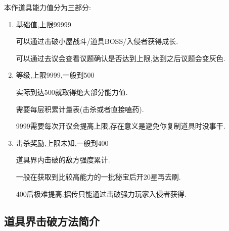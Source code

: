 	本作道具能力值分为三部分:

	\begin{enumerate}

		\item 
		基础值,上限99999

		可以通过击破小屋战斗/道具BOSS/入侵者获得成长.

		可以通过去议会查看议题确认是否达到上限,达到之后议题会变灰色.

		\item
		等级,上限9999,一般到500

		实际到达500就取得绝大部分能力值.

		需要每层积累计量表(击杀或者直接嗑药).

		9999需要每次开议会提高上限,存在意义是避免你复制道具时没事干.

		\item
		击杀奖励,上限未知,一般到400

		道具界内击破的敌方强度累计.

		一般在获取到比较高能力的一批秘宝后开20星再去刷.

		400后极难提高.据传只能通过击破强力玩家入侵者获得.

	\end{enumerate}
	

	\subsection{道具界击破方法简介}

